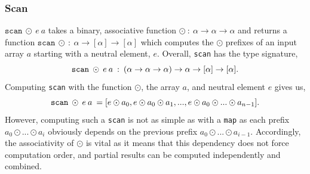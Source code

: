 \documentclass[11pt,bibliography=totocnumbered]{article}
\begin{document}
\subsubsection{Scan}
$\texttt{scan} \: \odot \: e \: a$ takes a binary, associative function $\odot \: : \: \alpha \to \alpha \to \alpha$ and returns a function
 $\mathtt{scan} \:\odot \: : \: \alpha \to [\alpha] \to [\alpha]$ which
 computes the $\odot$ prefixes of an input array $a$ starting with a neutral element, $e$. Overall, \texttt{scan} has the type signature,
$$\mathtt{scan} \: \odot \: e \: a \: : \:(\alpha \to \alpha \to \alpha) \to \alpha \to [\alpha] \to [\alpha]\mathnormal{.}$$
Computing \texttt{scan} with the function $\odot$, the array $a$, and neutral element $e$ gives us,
$$\mathtt{scan} \: \odot \: e \: a \: = [e \odot a_0, e \odot a_0 \odot a_1, ..., e \odot a_0 \odot ... \odot a_{n-1}]\mathnormal{.}$$
However, computing such a \texttt{scan} is not as simple as with a \texttt{map} as each prefix $a_0 \odot ... \odot a_i$ obviously depends on the previous prefix $a_0 \odot ... \odot a_{i-1}$. Accordingly, 
the associativity of $\odot$ is vital as it means that this dependency does not force computation order, and partial results can be computed independently and combined.
\end{document}
